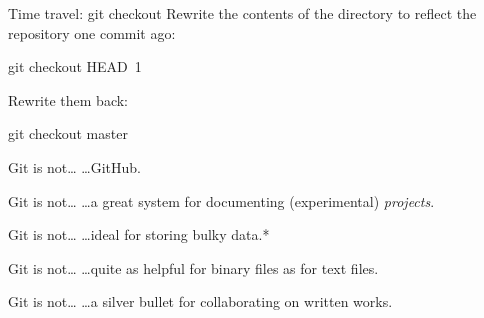 \begin{frame}[fragile]{Time travel: git checkout}
  Rewrite the contents of the directory to reflect the repository one commit
  ago:

  \begin{gitCommand}git checkout HEAD~1\end{gitCommand}

  Rewrite them back:

  \begin{gitCommand}git checkout master\end{gitCommand}

\end{frame}

\begin{frame}{Git is not\ldots}
  \hangindent=26pt \huge {
  \ldots GitHub.
  }
\end{frame}

\begin{frame}{Git is not\ldots}
  \hangindent=26pt \huge {
  \ldots a great system for documenting (experimental) \emph{projects}.
  }
\end{frame}

\begin{frame}{Git is not\ldots}
  \hangindent=26pt \huge {
  \ldots ideal for storing bulky data.*
  }
\end{frame}

\begin{frame}{Git is not\ldots}
  \hangindent=26pt \huge {
  \ldots quite as helpful for binary files as for text files.
  }
\end{frame}

\begin{frame}{Git is not\ldots}
  \hangindent=26pt \huge {
  \ldots a silver bullet for collaborating on written works.
  }
\end{frame}

